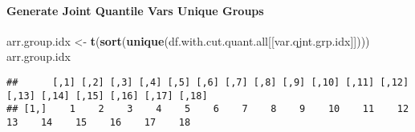 \documentclass[
]{book}
\newenvironment{Shaded}{\begin{snugshade}}{\end{snugshade}}
\newcommand{\CommentTok}[1]{\textcolor[rgb]{0.56,0.35,0.01}{\textit{#1}}}
\newcommand{\DataTypeTok}[1]{\textcolor[rgb]{0.13,0.29,0.53}{#1}}
\newcommand{\KeywordTok}[1]{\textcolor[rgb]{0.13,0.29,0.53}{\textbf{#1}}}
\newcommand{\NormalTok}[1]{#1}
\newcommand{\OperatorTok}[1]{\textcolor[rgb]{0.81,0.36,0.00}{\textbf{#1}}}
\newcommand{\StringTok}[1]{\textcolor[rgb]{0.31,0.60,0.02}{#1}}
\begin{document}
\hypertarget{generate-joint-quantile-vars-unique-groups}{%
\paragraph{Generate Joint Quantile Vars Unique Groups}\label{generate-joint-quantile-vars-unique-groups}}

\begin{Shaded}
\end{Shaded}

\begin{Shaded}
\begin{Highlighting}[]
\NormalTok{arr.group.idx <-}\StringTok{ }\KeywordTok{t}\NormalTok{(}\KeywordTok{sort}\NormalTok{(}\KeywordTok{unique}\NormalTok{(df.with.cut.quant.all[[var.qjnt.grp.idx]])))}
\NormalTok{arr.group.idx}
\end{Highlighting}
\end{Shaded}

\begin{verbatim}
##      [,1] [,2] [,3] [,4] [,5] [,6] [,7] [,8] [,9] [,10] [,11] [,12] [,13] [,14] [,15] [,16] [,17] [,18]
## [1,]    1    2    3    4    5    6    7    8    9    10    11    12    13    14    15    16    17    18
\end{verbatim}

\begin{Shaded}
\end{Shaded}
\end{document}
